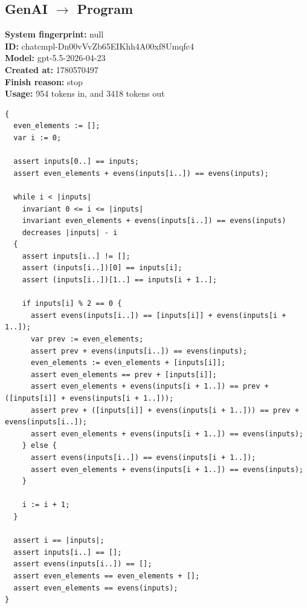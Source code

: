\documentclass{article}
\begin{document}
\subsection*{GenAI $\rightarrow$ Program}
\textbf{System fingerprint: }null
\\\textbf{ID: }chatcmpl-Dn00vVvZb65EIKhh4A00xf8Umqfc4
\\\textbf{Model: }gpt-5.5-2026-04-23
\\\textbf{Created at: }1780570497
\\\textbf{Finish reason: }stop
\\\textbf{Usage: }954 tokens in, and 3418 tokens out
\begin{lstlisting}
{
  even_elements := [];
  var i := 0;

  assert inputs[0..] == inputs;
  assert even_elements + evens(inputs[i..]) == evens(inputs);

  while i < |inputs|
    invariant 0 <= i <= |inputs|
    invariant even_elements + evens(inputs[i..]) == evens(inputs)
    decreases |inputs| - i
  {
    assert inputs[i..] != [];
    assert (inputs[i..])[0] == inputs[i];
    assert (inputs[i..])[1..] == inputs[i + 1..];

    if inputs[i] % 2 == 0 {
      assert evens(inputs[i..]) == [inputs[i]] + evens(inputs[i + 1..]);
      var prev := even_elements;
      assert prev + evens(inputs[i..]) == evens(inputs);
      even_elements := even_elements + [inputs[i]];
      assert even_elements == prev + [inputs[i]];
      assert even_elements + evens(inputs[i + 1..]) == prev + ([inputs[i]] + evens(inputs[i + 1..]));
      assert prev + ([inputs[i]] + evens(inputs[i + 1..])) == prev + evens(inputs[i..]);
      assert even_elements + evens(inputs[i + 1..]) == evens(inputs);
    } else {
      assert evens(inputs[i..]) == evens(inputs[i + 1..]);
      assert even_elements + evens(inputs[i + 1..]) == evens(inputs);
    }

    i := i + 1;
  }

  assert i == |inputs|;
  assert inputs[i..] == [];
  assert evens(inputs[i..]) == [];
  assert even_elements == even_elements + [];
  assert even_elements == evens(inputs);
}
\end{lstlisting}
\end{document}
